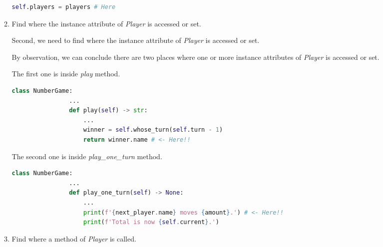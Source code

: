 \documentclass[12pt]{article}
\begin{document}
\begin{enumerate}[1.]
\begin{mdframed}
\begin{enumerate}[1.]
\begin{mdframed}
\begin{lstlisting}[language=Python]
                    self.players = players # Here
            \end{lstlisting}


            \end{mdframed}

            \item Find where the instance attribute of \textit{Player} is accessed or set.

            \bigskip

            \begin{mdframed}

            Second, we need to find where the instance attribute of \textit{Player} is accessed or set.

            \bigskip

            By observation, we can conclude there are two places where one or more instance
            attributes of \textit{Player} is accessed or set.

            \bigskip

            The first one is inside \textit{play} method.

            \begin{lstlisting}[language=Python]
            class NumberGame:
                ...
                def play(self) -> str:
                    ...
                    winner = self.whose_turn(self.turn - 1)
                    return winner.name # <- Here!!
            \end{lstlisting}

            \bigskip

            The second one is inside \textit{play\_one\_turn} method.

            \begin{lstlisting}[language=Python]
            class NumberGame:
                ...
                def play_one_turn(self) -> None:
                    ...
                    print(f'{next_player.name} moves {amount}.') # <- Here!!
                    print(f'Total is now {self.current}.')
            \end{lstlisting}

            \end{mdframed}

            \item Find where a method of \textit{Player} is called.

            \bigskip

            \begin{mdframed}


\end{mdframed}
\end{enumerate}
\end{mdframed}
\end{enumerate}
\end{document}

